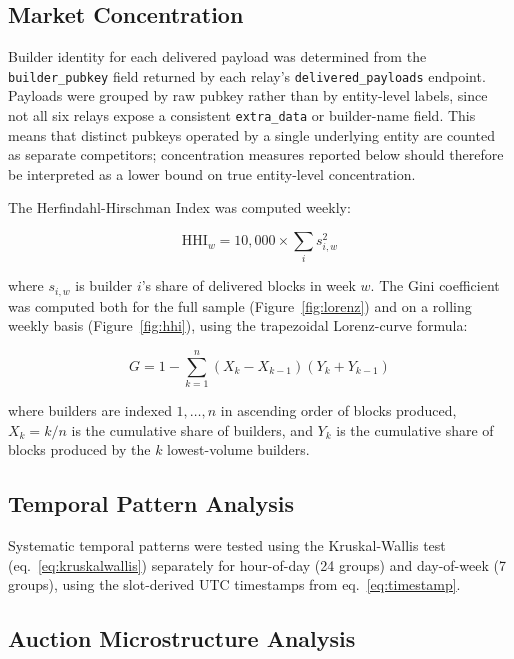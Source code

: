 \documentclass[11pt]{article}
\begin{document}
\subsection{Market Concentration}

Builder identity for each delivered payload was determined from the
\texttt{builder\_pubkey} field returned by each relay's
\texttt{delivered\_payloads} endpoint. Payloads were grouped by raw pubkey
rather than by entity-level labels, since not all six relays expose a consistent
\texttt{extra\_data} or builder-name field. This means that distinct pubkeys
operated by a single underlying entity are counted as separate competitors;
concentration measures reported below should therefore be interpreted as a lower
bound on true entity-level concentration.

The Herfindahl-Hirschman Index was computed weekly:

\begin{equation}
\text{HHI}_w = 10{,}000 \times \sum_i s_{i,w}^2
\label{eq:hhi}
\end{equation}

where $s_{i,w}$ is builder $i$'s share of delivered blocks in week $w$. The
Gini coefficient was computed both for the full sample (Figure~\ref{fig:lorenz})
and on a rolling weekly basis (Figure~\ref{fig:hhi}), using the trapezoidal
Lorenz-curve formula:

\begin{equation}
G = 1 - \sum_{k=1}^{n} (X_k - X_{k-1})(Y_k + Y_{k-1})
\label{eq:gini}
\end{equation}

where builders are indexed $1, \ldots, n$ in ascending order of blocks produced,
$X_k = k/n$ is the cumulative share of builders, and $Y_k$ is the cumulative
share of blocks produced by the $k$ lowest-volume builders.

\subsection{Temporal Pattern Analysis}

Systematic temporal patterns were tested using the Kruskal-Wallis test
(eq.~\ref{eq:kruskalwallis}) separately for hour-of-day (24 groups) and
day-of-week (7 groups), using the slot-derived UTC timestamps from
eq.~\ref{eq:timestamp}.

\subsection{Auction Microstructure Analysis}
\end{document}
